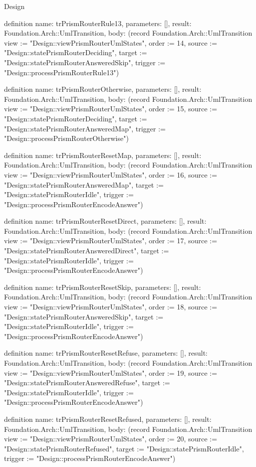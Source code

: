 \begin{lexlean}{Design}
\begin{semanticmodule}
definition{
  name: trPrismRouterRule13,
  parameters: [],
  result: Foundation.Arch::UmlTransition,
  body: (record Foundation.Arch::UmlTransition {view := "Design::viewPrismRouterUmlStates", order := 14, source := "Design::statePrismRouterDeciding", target := "Design::statePrismRouterAnsweredSkip", trigger := "Design::processPrismRouterRule13"})
}

definition{
  name: trPrismRouterOtherwise,
  parameters: [],
  result: Foundation.Arch::UmlTransition,
  body: (record Foundation.Arch::UmlTransition {view := "Design::viewPrismRouterUmlStates", order := 15, source := "Design::statePrismRouterDeciding", target := "Design::statePrismRouterAnsweredMap", trigger := "Design::processPrismRouterOtherwise"})
}

definition{
  name: trPrismRouterResetMap,
  parameters: [],
  result: Foundation.Arch::UmlTransition,
  body: (record Foundation.Arch::UmlTransition {view := "Design::viewPrismRouterUmlStates", order := 16, source := "Design::statePrismRouterAnsweredMap", target := "Design::statePrismRouterIdle", trigger := "Design::processPrismRouterEncodeAnswer"})
}

definition{
  name: trPrismRouterResetDirect,
  parameters: [],
  result: Foundation.Arch::UmlTransition,
  body: (record Foundation.Arch::UmlTransition {view := "Design::viewPrismRouterUmlStates", order := 17, source := "Design::statePrismRouterAnsweredDirect", target := "Design::statePrismRouterIdle", trigger := "Design::processPrismRouterEncodeAnswer"})
}

definition{
  name: trPrismRouterResetSkip,
  parameters: [],
  result: Foundation.Arch::UmlTransition,
  body: (record Foundation.Arch::UmlTransition {view := "Design::viewPrismRouterUmlStates", order := 18, source := "Design::statePrismRouterAnsweredSkip", target := "Design::statePrismRouterIdle", trigger := "Design::processPrismRouterEncodeAnswer"})
}

definition{
  name: trPrismRouterResetRefuse,
  parameters: [],
  result: Foundation.Arch::UmlTransition,
  body: (record Foundation.Arch::UmlTransition {view := "Design::viewPrismRouterUmlStates", order := 19, source := "Design::statePrismRouterAnsweredRefuse", target := "Design::statePrismRouterIdle", trigger := "Design::processPrismRouterEncodeAnswer"})
}

definition{
  name: trPrismRouterResetRefused,
  parameters: [],
  result: Foundation.Arch::UmlTransition,
  body: (record Foundation.Arch::UmlTransition {view := "Design::viewPrismRouterUmlStates", order := 20, source := "Design::statePrismRouterRefused", target := "Design::statePrismRouterIdle", trigger := "Design::processPrismRouterEncodeAnswer"})
}


\end{semanticmodule}
\end{lexlean}
